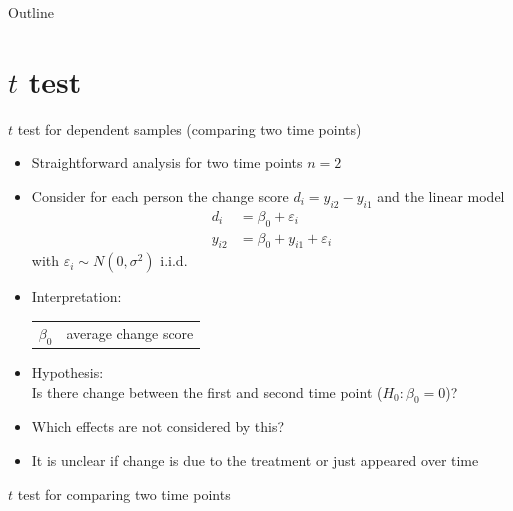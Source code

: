 \documentclass[aspectratio=169]{beamer}
\begin{document}
\begin{frame}{Outline}
\tableofcontents
\end{frame}

\section[$t$ test]{$t$ test}

\begin{frame}{$t$ test for dependent samples (comparing two time points)}
\begin{itemize}
  \item Straightforward analysis for two time points $n = 2$
  \item Consider for each person the change score $d_i = y_{i2} - y_{i1}$
    and the linear model
    \begin{align*}
         d_i &= \beta_0 + \varepsilon_i \\
      y_{i2} &= \beta_0 + y_{i1} + \varepsilon_i
    \end{align*}
    with $\varepsilon_i \sim N(0, \sigma^2)$ i.i.d.
  \item Interpretation:
    \begin{center}
    \begin{tabular}{ll}
    $\beta_0$ & average change score
    \end{tabular}
    \end{center}
  \item Hypothesis:\\
        Is there change between the first and second time point ($H_0\colon \beta_0 = 0$)?
  \item Which effects are not considered by this?
    \pause
  \item It is unclear if change is due to the treatment or just appeared
    over time
\end{itemize}
\end{frame}

\begin{frame}{$t$ test for comparing two time points}
\begin{center}
\end{center}
\end{frame}
\end{document}
